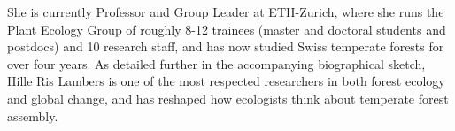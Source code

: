 

She is currently Professor and Group Leader at ETH-Zurich, where she runs the Plant Ecology Group of roughly 8-12 trainees (master and doctoral students and postdocs) and 10 research staff, and has now studied Swiss temperate forests for over four years. As detailed further in the accompanying biographical sketch, Hille Ris Lambers is one of the most respected researchers in both forest ecology and global change, and has reshaped how ecologists think about temperate forest assembly. 
